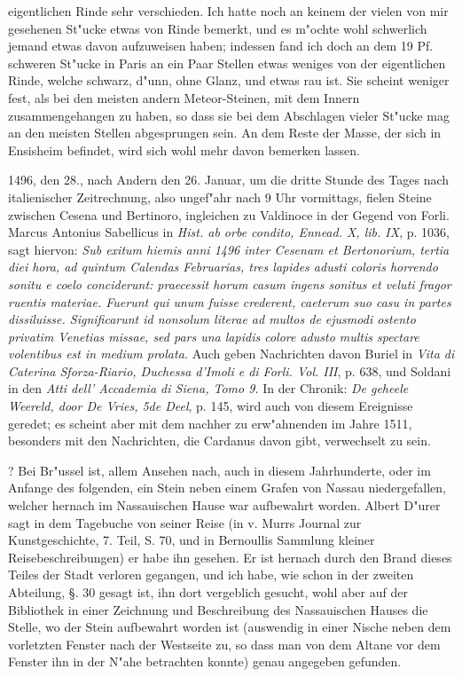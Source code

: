 \documentclass[a4paper, 11pt, oneside, polutonikogreek, german]{article}
\begin{document}
eigentlichen Rinde sehr verschieden. Ich hatte noch an keinem der vielen von mir gesehenen St"ucke etwas von Rinde bemerkt, und es m"ochte wohl schwerlich jemand etwas davon aufzuweisen haben; indessen fand ich doch an dem 19 Pf. schweren St"ucke in Paris an ein Paar Stellen etwas weniges von der eigentlichen Rinde, welche schwarz, d"unn, ohne Glanz, und etwas rau ist. Sie scheint weniger fest, als bei den meisten andern Meteor-Steinen, mit dem Innern zusammengehangen zu haben, so dass sie bei dem Abschlagen vieler St"ucke mag an den meisten Stellen abgesprungen sein. An dem Reste der Masse, der sich in Ensisheim befindet, wird sich wohl mehr davon bemerken lassen.

1496, den 28., nach Andern den 26. Januar, um die dritte Stunde des Tages nach italienischer Zeitrechnung, also ungef"ahr nach 9 Uhr vormittags, fielen Steine zwischen Cesena und Bertinoro, ingleichen zu Valdinoce in der Gegend von Forli. Marcus Antonius Sabellicus in \emph{Hist. ab orbe condito, Ennead. X, lib. IX}, p. 1036, sagt hiervon: \emph{Sub exitum hiemis anni 1496 inter Cesenam et Bertonorium, tertia diei hora, ad quintum Calendas Februarias, tres lapides adusti coloris horrendo sonitu e coelo conciderunt: praecessit horum casum ingens sonitus et veluti fragor ruentis materiae. Fuerunt qui unum fuisse crederent, caeterum suo casu in partes dissiluisse. Significarunt id nonsolum literae ad multos de ejusmodi ostento privatim Venetias missae, sed pars una lapidis colore adusto multis spectare volentibus est in medium prolata.} Auch geben Nachrichten davon Buriel in \emph{Vita di Caterina Sforza-Riario, Duchessa d'Imoli e di Forli. Vol. III}, p. 638, und Soldani in den \emph{Atti dell' Accademia di Siena, Tomo 9.} In der Chronik: \emph{De geheele Weereld, door De Vries, 5de Deel}, p. 145, wird auch von diesem Ereignisse geredet; es scheint aber mit dem nachher zu erw"ahnenden im Jahre 1511, besonders mit den Nachrichten, die Cardanus davon gibt, verwechselt zu sein.

? Bei Br"ussel ist, allem Ansehen nach, auch in diesem Jahrhunderte, oder im Anfange des folgenden, ein Stein neben einem Grafen von Nassau niedergefallen, welcher hernach im Nassauischen Hause war aufbewahrt worden. Albert D"urer sagt in dem Tagebuche von seiner Reise (in v. Murrs Journal zur Kunstgeschichte, 7. Teil, S. 70, und in Bernoullis Sammlung kleiner Reisebeschreibungen) er habe ihn gesehen. Er ist hernach durch den Brand dieses Teiles der Stadt verloren gegangen, und ich habe, wie schon in der zweiten Abteilung, §. 30 gesagt ist, ihn dort vergeblich gesucht, wohl aber auf der Bibliothek in einer Zeichnung und Beschreibung des Nassauischen Hauses die Stelle, wo der Stein aufbewahrt worden ist (auswendig in einer Nische neben dem vorletzten Fenster nach der Westseite zu, so dass man von dem Altane vor dem Fenster ihn in der N"ahe betrachten konnte) genau angegeben gefunden.
\end{document}
